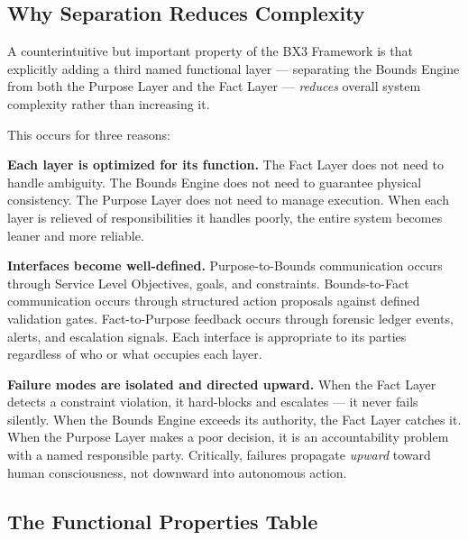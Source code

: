 \documentclass[12pt]{article}
\begin{document}
\subsection{Why Separation Reduces Complexity}

A counterintuitive but important property of the BX3 Framework is that explicitly adding a third named functional layer --- separating the Bounds Engine from both the Purpose Layer and the Fact Layer --- \textit{reduces} overall system complexity rather than increasing it.

This occurs for three reasons:

\textbf{Each layer is optimized for its function.} The Fact Layer does not need to handle ambiguity. The Bounds Engine does not need to guarantee physical consistency. The Purpose Layer does not need to manage execution. When each layer is relieved of responsibilities it handles poorly, the entire system becomes leaner and more reliable.

\textbf{Interfaces become well-defined.} Purpose-to-Bounds communication occurs through Service Level Objectives, goals, and constraints. Bounds-to-Fact communication occurs through structured action proposals against defined validation gates. Fact-to-Purpose feedback occurs through forensic ledger events, alerts, and escalation signals. Each interface is appropriate to its parties regardless of who or what occupies each layer.

\textbf{Failure modes are isolated and directed upward.} When the Fact Layer detects a constraint violation, it hard-blocks and escalates --- it never fails silently. When the Bounds Engine exceeds its authority, the Fact Layer catches it. When the Purpose Layer makes a poor decision, it is an accountability problem with a named responsible party. Critically, failures propagate \textit{upward} toward human consciousness, not downward into autonomous action.

\subsection{The Functional Properties Table}
\end{document}

